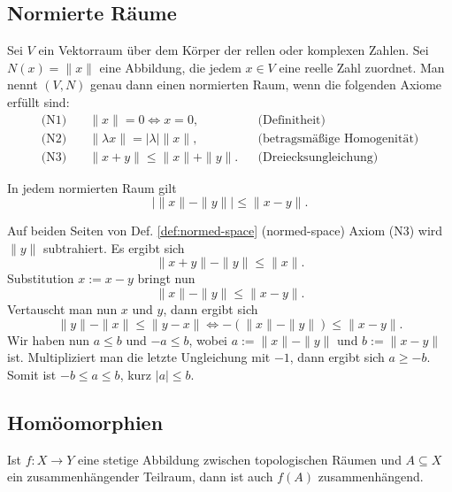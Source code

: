 \subsection{Normierte Räume}
\begin{Definition}%
\label{def:normed-space}
Sei $V$ ein Vektorraum über dem Körper der rellen oder komplexen
Zahlen. Sei $N(x)=\|x\|$ eine Abbildung, die jedem $x\in V$ eine
reelle Zahl zuordnet. Man nennt $(V,N)$ genau dann einen
normierten Raum, wenn die folgenden Axiome erfüllt sind:
\begin{align*}
\text{(N1)}\quad &\|x\|=0\iff x=0,&&\text{(Definitheit)}\\
\text{(N2)}\quad &\|\lambda x\|=|\lambda|\|x\|,&&\text{(betragsmäßige Homogenität)}\\
\text{(N3)}\quad &\|x+y\| \le \|x\|+\|y\|.&&\text{(Dreiecksungleichung)}
\end{align*}
\end{Definition}

\begin{Satz}%
\label{rev-tineq}%
In jedem normierten Raum gilt
\[|\|x\|-\|y\|| \le \|x-y\|.\]
\end{Satz}
\begin{Beweis}
Auf beiden Seiten von Def. \ref{def:normed-space} (normed-space)
Axiom (N3) wird $\|y\|$ subtrahiert.
Es ergibt sich
\[\|x+y\| - \|y\| \le \|x\|.\]
Substitution $x:=x-y$ bringt nun
\[\|x\| - \|y\| \le \|x-y\|.\]
Vertauscht man nun $x$ und $y$, dann ergibt sich
\[\|y\|-\|x\| \le \|y-x\| \iff -(\|x\|-\|y\|)\le \|x-y\|.\]
Wir haben nun $a\le b$ und $-a\le b$,
wobei $a:=\|x\|-\|y\|$ und $b:=\|x-y\|$ ist. Multipliziert
man die letzte Ungleichung mit $-1$, dann ergibt sich $a\ge -b$.
Somit ist $-b\le a\le b$, kurz $|a|\le b$.\,\qedsymbol
\end{Beweis}

\subsection{Homöomorphien}
\begin{Satz}%
\label{intermediate-value-general}\newlinefirst
Ist $f\colon X\to Y$ eine stetige Abbildung zwischen topologischen
Räumen und $A\subseteq X$ ein zusammenhängender Teilraum,
dann ist auch $f(A)$ zusammenhängend.
\end{Satz}


